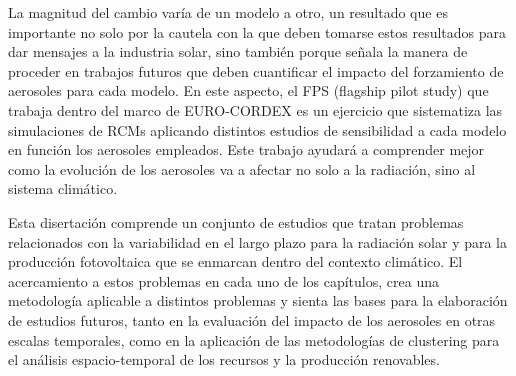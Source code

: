 La magnitud del cambio varía de un modelo a otro, un resultado que es importante no solo por la cautela con la que deben tomarse estos resultados para dar mensajes a la industria solar, sino también porque señala la manera de proceder en trabajos futuros que deben cuantificar el impacto del forzamiento de aerosoles para cada modelo. En este aspecto, el FPS (flagship pilot study) que trabaja dentro del marco de EURO-CORDEX es un ejercicio que sistematiza las simulaciones de RCMs aplicando distintos estudios de sensibilidad a cada modelo en función los aerosoles empleados. Este trabajo ayudará a comprender mejor como la evolución de los aerosoles va a afectar no solo a la radiación, sino al sistema climático.

Esta disertación comprende un conjunto de estudios que tratan problemas relacionados con la variabilidad en el largo plazo para la radiación solar y para la producción fotovoltaica que se enmarcan dentro del contexto climático. El acercamiento a estos problemas en cada uno de los capítulos, crea una metodología aplicable a distintos problemas y sienta las bases para la elaboración de estudios futuros, tanto en la evaluación del impacto de los aerosoles en otras escalas temporales, como en la aplicación de las metodologías de clustering para el análisis espacio-temporal de los recursos y la producción renovables. 